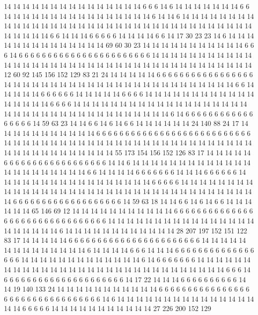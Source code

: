 14 14 14 14 14 14 14 14 14 14 14 14 14 14 14 6 6 6 14 6
14 14 14 14 14 14 14 6 6 14 14 14 14 14 14 14 14 14 14 14
14 14 14 14 14 6 14 14 6 14 14 14 14 14 14 14 14 14 14 14
14 14 14 14 14 14 14 14 14 14 14 14 14 14 14 14 14 14 14 14
14 14 14 14 14 14 14 14 14 6 6 14 14 14 6 6 6 6 6 14
14 14 14 6 6 14 17 30 23 23 14 6 14 14 14 14 14 14 14 14
14 14 14 14 14 14 69 60 30 23 14 14 14 14 14 14 14 14 14 14
14 6 6 6 14 6 6 6 6 6 6 6 6 6 6 6 6 6 6 6
6 6 6 6 6 6 6 6 14 14 14 14 14 14 14 14 14 14 14 14
14 14 14 14 14 14 14 14 14 14 14 14 14 14 14 14 14 14 14 14
14 14 14 14 14 14 12 60 92 145 156 152 129 83 21 24 14 14 14 14
14 6 6 6 6 6 6 6 6 6 6 6 6 6 6 6 6 6 14 14
14 14 14 14 14 14 14 14 14 14 14 14 14 14 14 14 14 14 14 14
14 14 14 6 6 14 14 14 14 14 6 6 6 6 6 6 14 14 14 14
14 6 6 6 6 14 14 14 14 14 14 14 14 14 14 14 14 14 14 14
14 14 6 6 6 6 14 14 14 14 14 14 14 14 14 14 14 14 14 14
14 14 14 14 14 14 14 14 14 14 14 14 14 14 14 14 14 14 14 14
14 14 14 6 14 6 6 6 6 6 6 6 6 6 6 6 6 6 6 6
6 6 14 59 63 23 14 14 6 6 14 6 14 6 6 14 14 14 14 14
14 24 140 88 24 17 14 14 14 14 14 14 14 14 14 14 14 6 6 6
6 6 6 6 6 6 6 6 6 6 6 6 6 6 6 6 6 6 6 6
6 6 6 6 14 14 14 14 14 14 14 14 14 14 14 14 14 14 14 14
14 14 14 14 14 14 14 14 14 14 14 14 14 14 14 14 14 14 14 14
14 14 14 55 173 154 156 152 126 83 17 14 14 14 14 14 6 6 6 6
6 6 6 6 6 6 6 6 6 6 6 6 6 6 14 14 6 14 14 14
14 14 14 14 14 14 14 14 14 14 14 14 14 14 14 14 14 14 14 6
6 14 14 14 14 6 6 6 6 6 6 6 14 14 14 6 6 6 6 6
6 14 14 14 14 14 14 14 14 14 14 14 14 14 14 14 14 14 6 6
6 6 6 14 14 14 14 14 14 14 14 14 14 14 14 14 14 14 14 14
14 14 14 14 14 14 14 14 14 14 14 14 14 14 14 14 14 14 14 6
6 6 6 6 6 6 6 6 6 6 6 6 6 6 6 6 6 6 14 59
63 18 14 14 6 6 14 6 14 6 6 14 14 14 14 14 14 65 146 69
12 14 14 14 14 14 14 14 14 14 14 14 6 6 6 6 6 6 6 6
6 6 6 6 6 6 6 6 6 6 6 6 6 6 6 6 6 6 6 6
6 6 6 6 14 14 14 14 14 14 14 14 14 14 14 14 14 14 14 14
14 14 14 14 14 14 6 14 14 14 14 14 14 14 14 14 14 14 14 28
207 197 152 151 122 83 17 14 14 14 14 14 6 6 6 6 6 6 6 6
6 6 6 6 6 6 6 6 6 6 6 6 6 6 6 14 14 14 14 14
14 14 14 14 14 14 14 14 14 6 14 14 14 14 6 6 6 14 14 14
6 6 6 6 6 6 6 6 6 6 6 6 6 6 6 6 6 14 14 14
14 14 14 14 14 14 14 14 14 14 6 14 6 6 6 6 6 6 6 14
14 14 14 14 14 14 14 14 14 14 14 14 14 14 14 14 14 14 14 14
14 14 14 14 14 14 14 14 14 6 6 6 14 6 6 6 6 6 6 6
6 6 6 6 6 6 6 6 6 6 6 6 6 6 14 17 22 14 14 14
6 6 6 6 6 6 6 6 6 6 14 14 19 140 133 24 14 14 14 14
14 14 14 14 14 14 14 6 6 6 6 6 6 6 6 6 6 6 6 6
6 6 6 6 6 6 6 6 6 6 6 6 6 6 6 6 6 6 6 6
14 6 14 14 14 14 14 14 14 14 14 14 14 14 14 14 14 14 14 6
6 6 6 6 14 14 14 14 14 14 14 14 14 14 14 27 226 200 152 129
